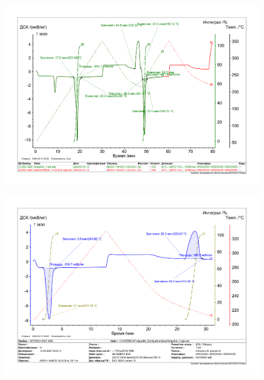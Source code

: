 \documentclass[a4paper,12pt]{article} %
\begin{document}
\begin{enumerate}
 \begin{figure}[H]
    \centering
    \includegraphics[width = 180 mm]{p1.pdf}
\end{figure}
\begin{figure}[H]
  \centering
  \includegraphics[width = 180 mm]{p2.pdf}
\end{figure}


\end{enumerate}
\end{document}
